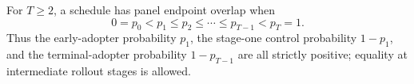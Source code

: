 For \(T\ge2\), a schedule has panel endpoint overlap when
\[
 0=p_0<p_1\le p_2\le\cdots\le p_{T-1}<p_T=1.
\]
Thus the early-adopter probability \(p_1\), the stage-one control probability \(1-p_1\), and the terminal-adopter probability \(1-p_{T-1}\) are all strictly positive; equality at intermediate rollout stages is allowed.